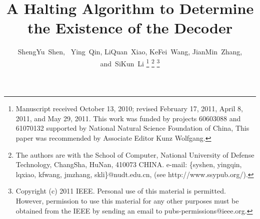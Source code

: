 \documentclass[journal]{IEEEtran}
\begin{document}
%
\title{A Halting Algorithm to Determine the Existence of the Decoder}
%
%
%

\author{ShengYu~Shen,~
        Ying~Qin,
        LiQuan~Xiao,
        KeFei~Wang,
        JianMin~Zhang,
        and~SiKun~Li%
\thanks{Manuscript received October 13, 2010; 
revised February 17, 2011, April
8, 2011, and May 29, 2011.
This work was funded by projects 60603088 and 61070132 supported by National Natural Science Foundation of China,
This paper was recommended by Associate Editor Kunz Wolfgang.}
\thanks{The authors are with the School of Computer,
National University of Defense Technology, ChangSha,
HuNan, 410073 CHINA. e-mail: \{syshen, yingqin, lqxiao, kfwang, jmzhang, skli\}@nudt.edu.cn, (see http://www.ssypub.org/).}%
\thanks{Copyright (c) 2011 IEEE. Personal use of this material is
permitted. However, permission to use this material
for any other purposes must be obtained from the IEEE by
sending an email to pubs-permissions@ieee.org.}
}
%
%
\end{document}
